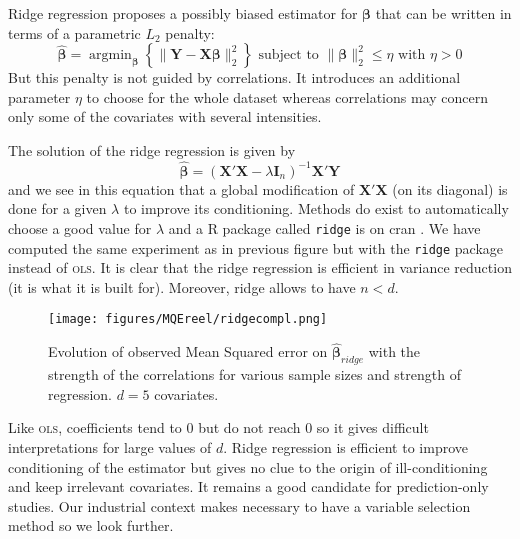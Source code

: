 \documentclass[12pt,a4paper]{report}
\begin{document}
Ridge regression \cite{hoerl1970ridge,marquardt1975ridge} proposes a possibly biased estimator for $\boldsymbol{\beta}$ that can be written in terms of a parametric $L_2$ penalty:
	\begin{equation}
		 \boldsymbol{\hat{\beta}}=\operatorname{argmin}_{\boldsymbol{\beta}} \left\lbrace \parallel \boldsymbol{Y}-\boldsymbol{X\beta}\parallel_2^2 \right\rbrace \textrm{ subject to } \parallel \boldsymbol{\beta} \parallel_2^2\leq \eta \textrm{ with } \eta>0
	\end{equation}
	But this penalty is not guided by correlations. It introduces an additional parameter $\eta$ to choose for the whole dataset  whereas correlations may concern only some of the covariates with several intensities.
	
	The solution of the ridge regression is given by
	\begin{equation}
		 \hat{\boldsymbol{\beta}}=\left(\boldsymbol{X}'\boldsymbol{X} -\lambda\boldsymbol{I}_n\right) ^{-1}\boldsymbol{X}'\boldsymbol{Y}\label{betaridge}
	\end{equation}
	and we see in this equation that a global modification of $\boldsymbol{X}'\boldsymbol{X}$ (on its diagonal) is done for a given $\lambda$ to improve its conditioning. Methods do exist to automatically choose a good value for $\lambda$ \cite{cule2013ridge,er2013systematic} and a R package called {\tt ridge} is on {\sc cran} \cite{packageridge}. 
	We have computed the same experiment as in previous figure but with the {\tt ridge} package instead of \textsc{ols}. It is clear that the ridge regression is efficient in variance reduction (it is what it is built for). Moreover, ridge allows to have $n<d$.\\
	
	 \begin{figure}
	 \centering
	  \texttt{[image: figures/MQEreel/ridgecompl.png]}
	  \caption{Evolution of observed Mean Squared error on $\hat{\boldsymbol{\beta}}_{ridge}$ with the strength of the correlations for various sample sizes and strength of regression. $d=5$ covariates. } \label{MQEridgecompl}
	\end{figure}
	
	
	Like \textsc{ols}, coefficients tend to 0 but do not reach 0 so it gives difficult interpretations for large values of $d$. Ridge regression is efficient to improve conditioning of the estimator but gives no clue to the origin of ill-conditioning and keep irrelevant covariates. It remains a good candidate for prediction-only studies. Our industrial context makes necessary to have a variable selection method so we look further.
	
\end{document}
